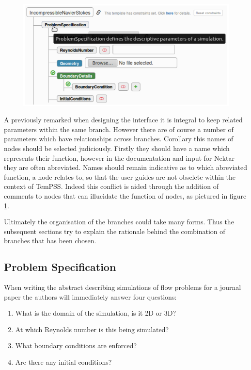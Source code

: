 \documentclass[11pt, a4paper]{report}
\begin{document}
\begin{figure}[htb!]
 \centering
 \includegraphics[width=.75\linewidth,  clip=true, trim = 0cm 0cm 0cm 0cm]{documentation}
 \label{fig:documentation}
\end{figure}

A previously remarked when designing the interface it is integral to keep related parameters within the same branch. However there are of course a number of parameters which have relationships across branches. Corollary this names of nodes should be selected judiciously. Firstly they should have a name which represents their function, however in the documentation and input for Nektar they are often abreviated. Names should remain indicative as to which abreviated function, a node relates to, so that the user guides are not obselete within the context of TemPSS. Indeed this conflict is aided through the addition of comments to nodes that can illucidate the function of nodes, as pictured in figure \ref{fig:documentation}.

Ultimately the organisation of the branches could take many forms. Thus the subsequent sections try to explain the rationale behind the combination of branches that has been chosen.

\subsection{Problem Specification}
When writing the abstract describing simulations of flow problems for a journal paper the authors will immediately answer four questions:
\begin{enumerate}
\item What is the domain of the simulation, is it 2D or 3D?
\item At which Reynolds number is this being simulated?
\item What boundary conditions are enforced?
\item Are there any initial conditions?
\end{enumerate}
\end{document}
